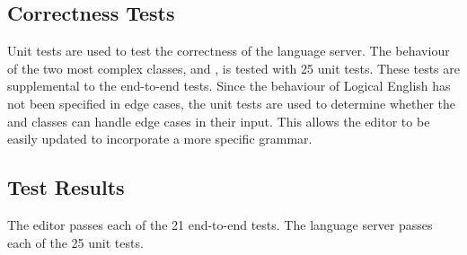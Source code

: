 \documentclass[../main.tex]{subfiles}
\begin{document}
\subsection{Correctness Tests}
Unit tests are used to test the correctness of the language server. The behaviour of the two most complex classes,  and , is tested with 25 unit tests. These tests are supplemental to the end-to-end tests. Since the behaviour of Logical English has not been specified in edge cases, the unit tests are used to determine whether the  and  classes can handle edge cases in their input. This allows the editor to be easily updated to incorporate a more specific grammar.

\subsection{Test Results}
The editor passes each of the 21 end-to-end tests. The language server passes each of the 25 unit tests.
\end{document}
